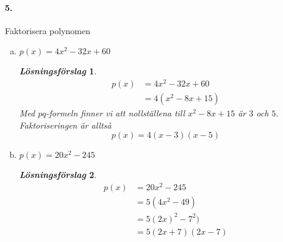 \documentclass[a4paper]{article}
\newtheorem*{sol}{\normalfont\textit{Lösningsförslag}}
\begin{document}
\paragraph{5.} Faktorisera polynomen
\begin{enumerate}[(a)] 
\item $p(x) = 4x^2 -32x +60$
  \begin{sol}
    \begin{align*}
      p(x) &= 4x^2 -32x + 60 \\[1em]
      &= 4(x^2-8x + 15) 
    \end{align*}
    Med $pq$-formeln finner vi att nollställena till $x^2-8x+15$ är
    $3$ och $5$. Faktoriseringen är alltså
    \[
      p(x) = 4(x-3)(x-5)
    \]
  \end{sol}
\item $p(x) = 20x^2 -245$
  \begin{sol}
    \begin{align*}
      p(x) &= 20x^2 - 245 \\[1em]
      &= 5(4x^2 - 49) \\[1em]
      &= 5(2x)^2 - 7^2) \\[1em]
      &= 5(2x +7)(2x-7) \\[1em]
    \end{align*}
  \end{sol}
\end{enumerate}
\end{document}
